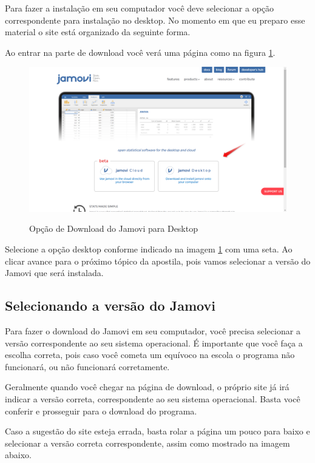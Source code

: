 Para fazer a instalação em seu computador você deve selecionar a opção correspondente para instalação no desktop. No momento em que eu preparo esse material o site está organizado da seguinte forma.

Ao entrar na parte de download você verá uma página como na figura \ref{fig:download_jamovi}.

\begin{figure}[H]
  \centering
  \caption{Opção de Download do Jamovi para Desktop}
  \includegraphics[width=\textwidth]{imagens/cap_1/download_jamovi.png}
  \label{fig:download_jamovi}
\end{figure}

Selecione a opção desktop conforme indicado na imagem \ref{fig:download_jamovi} com uma seta. Ao clicar avance para o próximo tópico da apostila, pois vamos selecionar a versão do Jamovi que será instalada.

\subsection{Selecionando a versão do Jamovi}

Para fazer o download do Jamovi em seu computador, você precisa selecionar a versão correspondente ao seu sistema operacional. É importante que você faça a escolha correta, pois caso você cometa um equívoco na escola o programa não funcionará, ou não funcionará corretamente.

Geralmente quando você chegar na página de download, o próprio site já irá indicar a versão correta, correspondente ao seu sistema operacional. Basta você conferir e prosseguir para o download do programa.

Caso a sugestão do site esteja errada, basta rolar a página um pouco para baixo e selecionar a versão correta correspondente, assim como mostrado na imagem abaixo.

